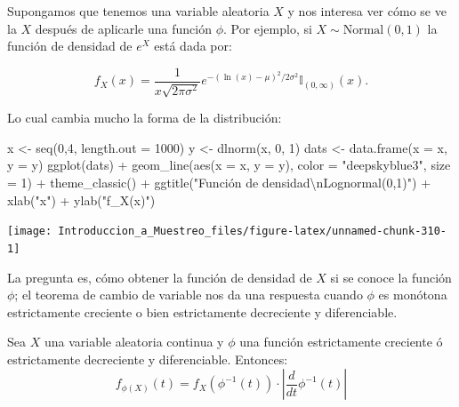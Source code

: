 \documentclass[
]{book}
\newenvironment{Shaded}{\begin{snugshade}}{\end{snugshade}}
\newcommand{\AttributeTok}[1]{\textcolor[rgb]{0.77,0.63,0.00}{#1}}
\newcommand{\DecValTok}[1]{\textcolor[rgb]{0.00,0.00,0.81}{#1}}
\newcommand{\FunctionTok}[1]{\textcolor[rgb]{0.00,0.00,0.00}{#1}}
\newcommand{\NormalTok}[1]{#1}
\newcommand{\OtherTok}[1]{\textcolor[rgb]{0.56,0.35,0.01}{#1}}
\newcommand{\SpecialCharTok}[1]{\textcolor[rgb]{0.00,0.00,0.00}{#1}}
\newcommand{\StringTok}[1]{\textcolor[rgb]{0.31,0.60,0.02}{#1}}
\begin{document}
Supongamos que tenemos una variable aleatoria \(X\) y nos interesa ver cómo se ve la \(X\) después de aplicarle una función \(\phi\). Por ejemplo, si \(X\sim\textrm{Normal}(0,1)\) la función de densidad de \(e^X\) está dada por:

\[
f_X(x) = \dfrac{1}{x \sqrt{2 \pi \sigma^2}}e^{-(\ln(x) - \mu)^2/2\sigma^2} \mathbb{I}_{(0,\infty)}(x).
\]

Lo cual cambia mucho la forma de la distribución:

\begin{Shaded}
\begin{Highlighting}[]
\NormalTok{x }\OtherTok{\textless{}{-}} \FunctionTok{seq}\NormalTok{(}\DecValTok{0}\NormalTok{,}\DecValTok{4}\NormalTok{, }\AttributeTok{length.out =} \DecValTok{1000}\NormalTok{)}
\NormalTok{y }\OtherTok{\textless{}{-}} \FunctionTok{dlnorm}\NormalTok{(x, }\DecValTok{0}\NormalTok{, }\DecValTok{1}\NormalTok{)}
\NormalTok{dats }\OtherTok{\textless{}{-}} \FunctionTok{data.frame}\NormalTok{(}\AttributeTok{x =}\NormalTok{ x, }\AttributeTok{y =}\NormalTok{ y)}
\FunctionTok{ggplot}\NormalTok{(dats) }\SpecialCharTok{+} \FunctionTok{geom\_line}\NormalTok{(}\FunctionTok{aes}\NormalTok{(}\AttributeTok{x =}\NormalTok{ x, }\AttributeTok{y =}\NormalTok{ y), }\AttributeTok{color =} \StringTok{"deepskyblue3"}\NormalTok{, }\AttributeTok{size =} \DecValTok{1}\NormalTok{) }\SpecialCharTok{+} \FunctionTok{theme\_classic}\NormalTok{() }\SpecialCharTok{+} \FunctionTok{ggtitle}\NormalTok{(}\StringTok{"Función de densidad}\SpecialCharTok{\textbackslash{}n}\StringTok{Lognormal(0,1)"}\NormalTok{) }\SpecialCharTok{+}
  \FunctionTok{xlab}\NormalTok{(}\StringTok{"x"}\NormalTok{) }\SpecialCharTok{+} \FunctionTok{ylab}\NormalTok{(}\StringTok{"f\_X(x)"}\NormalTok{)}
\end{Highlighting}
\end{Shaded}

\begin{center}\texttt{[image: Introduccion\_a\_Muestreo\_files/figure-latex/unnamed-chunk-310-1]} \end{center}

La pregunta es, cómo obtener la función de densidad de \(X\) si se conoce la función \(\phi\); el teorema de cambio de variable nos da una respuesta cuando \(\phi\) es monótona estrictamente creciente o bien estrictamente decreciente y diferenciable.

Sea \(X\) una variable aleatoria continua y \(\phi\) una función estrictamente creciente ó estrictamente decreciente y diferenciable. Entonces:
\[
f_{\phi(X)}(t)  = f_X( \phi^{-1}(t) ) \cdot \left| \dfrac{d}{dt}  \phi^{-1}(t)  \right|
\]
\end{document}
